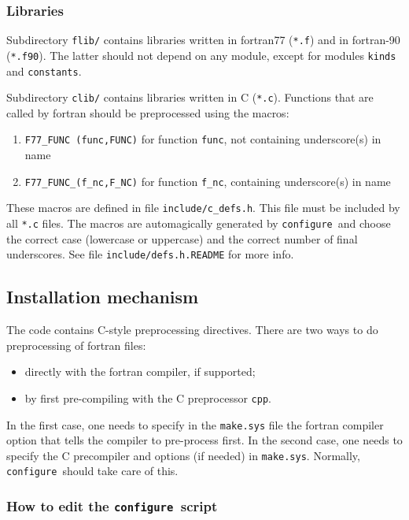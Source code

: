 \documentclass[12pt,a4paper]{article}
\def\configure{\texttt{configure}}
\begin{document}
\subsubsection{ Libraries}

Subdirectory \texttt{flib/} contains libraries written in fortran77 
(\texttt{*.f}) and in fortran-90 (\texttt{*.f90}).
The latter should not depend on any module, except for modules
\texttt{kinds} and \texttt{constants}.

Subdirectory \texttt{clib/} contains libraries written in C 
(\texttt{*.c}). Functions that are called by fortran
should be preprocessed using the macros:
\begin{enumerate}
\item \texttt{F77\_FUNC (func,FUNC)} for function \texttt{func}, not containing underscore(s) in name 
\item \texttt{F77\_FUNC\_(f\_nc,F\_NC)} for function \texttt{f\_nc}, containing underscore(s) in name
\end{enumerate}
These macros are defined in file \texttt{include/c\_defs.h}. This file must be included
by all \texttt{*.c} files. The macros are automagically generated by 
\configure\ and 
choose the correct case 
(lowercase or uppercase) and the correct number of final underscores. 
See file \texttt{include/defs.h.README} for more info.

\subsection{Installation mechanism}

\label{subsec:inst}
The code contains C-style preprocessing directives. There are two ways to do preprocessing of fortran files:
\begin{itemize}
\item directly with the fortran compiler, if supported;
\item by first pre-compiling with the C preprocessor \texttt{cpp}.
\end{itemize}

In the first case, one needs to specify in the \texttt{make.sys} file the fortran compiler option that tells the compiler to pre-process first. In the second case, one needs to
specify the C precompiler and options (if needed) in \texttt{make.sys}.
Normally, \configure\ should take care of this.


\subsubsection{ How to edit the \configure\ script}
\end{document}
